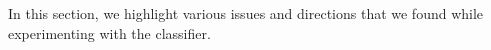 In this section, we highlight various issues and directions that we found while experimenting with the classifier.

